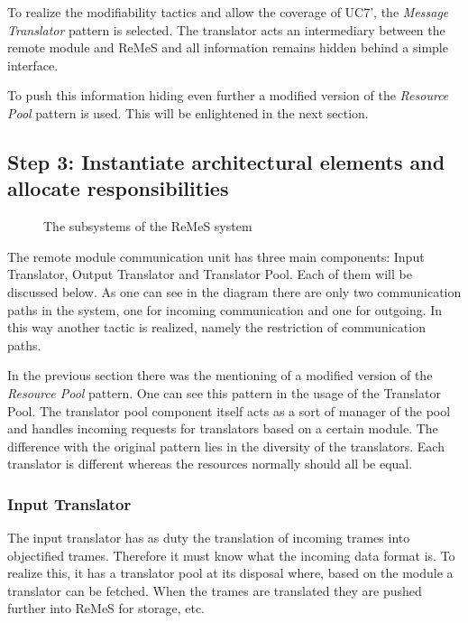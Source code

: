 \npar To realize the modifiability tactics and allow the coverage of UC7', the
\emph{Message Translator} pattern is selected. The translator acts an
intermediary between the remote module and ReMeS and all information remains
hidden behind a simple interface. 

\npar To push this information hiding even further a modified version of the
\emph{Resource Pool} pattern is used. This will be enlightened in the next
section.


\subsection{Step 3: Instantiate architectural elements and allocate responsibilities}
\label{add:it2/elements}

\begin{figure}[H]
	\begin{centering}
		\caption{The subsystems of the ReMeS system}
		\label{fig:add/it1/decomposition}
	\end{centering}
\end{figure}

\npar The remote module communication unit has three main components: Input
Translator, Output Translator and Translator Pool. Each of them will be
discussed below. As one can see in the diagram there are only two communication
paths in the system, one for incoming communication and one for outgoing. In
this way another tactic is realized, namely the restriction of communication
paths.

\npar In the previous section there was the mentioning of a modified version of
the \emph{Resource Pool} pattern. One can see this pattern in the usage of the
Translator Pool. The translator pool component itself acts as a sort of manager
of the pool and handles incoming requests for translators based on a
certain module. The difference with the original pattern lies in the 
diversity of the translators. Each translator is different whereas the
resources normally should all be equal. 

\subsubsection{Input Translator}

\npar The input translator has as duty the translation of incoming trames into
objectified trames. Therefore it must know what the incoming data format is.
To realize this, it has a translator pool at its disposal where, based on the
module a translator can be fetched. When the trames are translated they are
pushed further into ReMeS for storage, etc.

